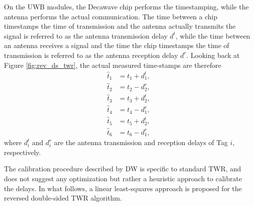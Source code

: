 \documentclass{decar-wsd}    %
\begin{document}
On the UWB modules, the Decawave chip performs the timestamping, while the antenna performs the actual communication. The time between a chip timestamps the time of transmission and the antenna actually transmits the signal is referred to as the antenna transmission delay $d^t$, while the time between an antenna receives a signal and the time the chip timestamps the time of transmission is referred to as the antenna reception delay $d^r$. Looking back at Figure \ref{fig:rev_ds_twr}, the actual measured time-stamps are therefore
\begin{align}
    \hat{t}_1 &= t_1 + d_1^t, \\
    \hat{t}_2 &= t_2 - d_2^r, \\
    \hat{t}_3 &= t_3 + d_2^t, \\
    \hat{t}_4 &= t_4 - d_1^r, \\ 
    \hat{t}_5 &= t_5 + d_2^t, \\
    \hat{t}_6 &= t_6 - d_1^r,
\end{align}
where $d_i^t$ and $d_i^r$ are the antenna transmission and reception delays of Tag $i$, respectively.

The calibration procedure described by DW is specific to standard TWR, and does not suggest any optimization but rather a heuristic approach to calibrate the delays. In what follows, a linear least-squares approach is proposed for the reversed double-sided TWR algorithm.
\end{document}
